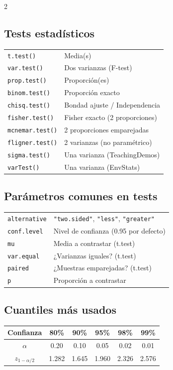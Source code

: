 \documentclass[9pt,a4paper]{article}
\begin{document}
\begin{multicols}{2}
\subsection{Tests estadísticos}
\begin{tabular}{@{}ll@{}}
\texttt{t.test()} & Media(s)\\
\texttt{var.test()} & Dos varianzas (F-test)\\
\texttt{prop.test()} & Proporción(es)\\
\texttt{binom.test()} & Proporción exacto\\
\texttt{chisq.test()} & Bondad ajuste / Independencia\\
\texttt{fisher.test()} & Fisher exacto (2 proporciones)\\
\texttt{mcnemar.test()} & 2 proporciones emparejadas\\
\texttt{fligner.test()} & 2 varianzas (no paramétrico)\\
\texttt{sigma.test()} & Una varianza (TeachingDemos)\\
\texttt{varTest()} & Una varianza (EnvStats)\\
\end{tabular}

\subsection{Parámetros comunes en tests}
\begin{tabular}{@{}ll@{}}
\texttt{alternative} & \texttt{"two.sided"}, \texttt{"less"}, \texttt{"greater"}\\
\texttt{conf.level} & Nivel de confianza (0.95 por defecto)\\
\texttt{mu} & Media a contrastar (t.test)\\
\texttt{var.equal} & ¿Varianzas iguales? (t.test)\\
\texttt{paired} & ¿Muestras emparejadas? (t.test)\\
\texttt{p} & Proporción a contrastar\\
\end{tabular}

\subsection{Cuantiles más usados}
\begin{center}
\begin{tabular}{c|ccccc}
Confianza & 80\% & 90\% & 95\% & 98\% & 99\%\\
\hline
$\alpha$ & 0.20 & 0.10 & 0.05 & 0.02 & 0.01\\
$z_{1-\alpha/2}$ & 1.282 & 1.645 & 1.960 & 2.326 & 2.576
\end{tabular}
\end{center}


\end{multicols}
\end{document}
